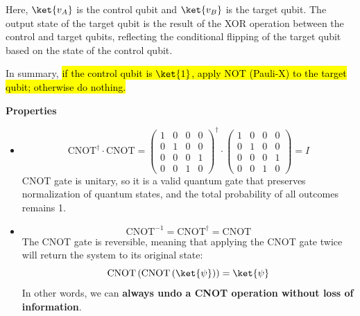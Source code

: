\noindent
Here, $\ket{v_{A}}$ is the control qubit and $\ket{v_{B}}$ is the target qubit. The output state of the target qubit is the result of the XOR operation between the control and target qubits, reflecting the conditional flipping of the target qubit based on the state of the control qubit.

\highspace
In summary, \hl{if the control qubit is $\ket{1}$, apply NOT (Pauli-X) to the target qubit; otherwise do nothing.}

\highspace
\begin{flushleft}
    \textcolor{Green3}{ \textbf{Properties}}
\end{flushleft}
\begin{itemize}
    \item {}
    \begin{equation*}
        \text{CNOT}^{\dagger} \cdot \text{CNOT} = \begin{pmatrix}
            1 & 0 & 0 & 0 \\
            0 & 1 & 0 & 0 \\
            0 & 0 & 0 & 1 \\
            0 & 0 & 1 & 0
        \end{pmatrix}^{\dagger} \cdot \begin{pmatrix}
            1 & 0 & 0 & 0 \\
            0 & 1 & 0 & 0 \\
            0 & 0 & 0 & 1 \\
            0 & 0 & 1 & 0
        \end{pmatrix} = I
    \end{equation*}
    CNOT gate is unitary, so it is a valid quantum gate that preserves normalization of quantum states, and the total probability of all outcomes remains 1.

    \item {}
    \begin{equation*}
        \text{CNOT}^{-1} = \text{CNOT}^{\dagger} = \text{CNOT}
    \end{equation*}
    The CNOT gate is reversible, meaning that applying the CNOT gate twice will return the system to its original state:
    \begin{equation*}
        \text{CNOT} \left(\text{CNOT}\left(\ket{\psi}\right)\right) = \ket{\psi}
    \end{equation*}
    In other words, we can \textbf{always undo a CNOT operation without loss of information}.


\end{itemize}
